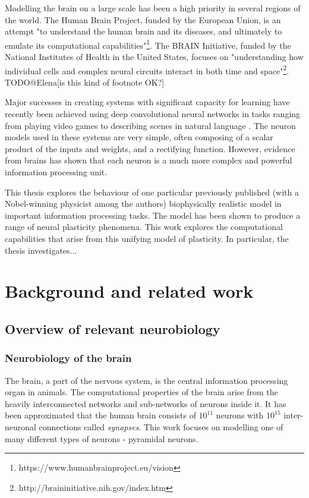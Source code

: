 \documentclass[a4paper,12pt]{report}
\theoremstyle{definition}
\begin{document}
Modelling the brain on a large scale has been a high priority in several regions of the world. The Human Brain Project, funded by the European Union, is an attempt "to understand the human brain and its diseases, and ultimately to emulate its computational capabilities"\footnote{https://www.humanbrainproject.eu/vision}. The BRAIN Initiative, funded by the National Institutes of Health in the United States, focuses on "understanding how individual cells and complex neural circuits interact in both time and space"\footnote{http://braininitiative.nih.gov/index.htm}. TODO@Elena[is this kind of footnote OK?]

Major successes in creating systems with significant capacity for learning have recently been achieved using deep convolutional neural networks in tasks ranging from playing video games \cite{mnih2015human} to describing scenes in natural language \cite{karpathy2014deep}. The neuron models used in these systems are very simple, often composing of a scalar product of the inputs and weights, and a rectifying function. However, evidence from brains has shown that each neuron is a much more complex and powerful information processing unit.

This thesis explores the behaviour of one particular previously published (with a Nobel-winning physicist among the authors) biophysically realistic model in important information processing tasks. The model has been shown to produce a range of neural plasticity phenomena. This work explores the computational capabilities that arise from this unifying model of plasticity. In particular, the thesis investigates...



\chapter{Background and related work}


\section{Overview of relevant neurobiology}

\subsection{Neurobiology of the brain}
The brain, a part of the nervous system, is the central information processing organ in animals. The computational properties of the brain arise from the heavily interconnected networks and sub-networks of neurons inside it. It has been approximated that the human brain consists of $10^{11}$ neurons with $10^{15}$ inter-neuronal connections \cite{herculano2009human} called \emph{synapses}. This work focuses on modelling one of many different types of neurons - pyramidal neurons.
\end{document}
